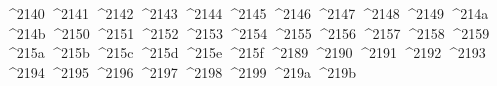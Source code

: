 {  ^^^^2140%
  ^^^^2141%
  ^^^^2142%
  ^^^^2143%
  ^^^^2144%
  ^^^^2145%
  ^^^^2146%
  ^^^^2147%
  ^^^^2148%
  ^^^^2149%
  ^^^^214a%
  ^^^^214b%
  ^^^^2150%
  ^^^^2151%
  ^^^^2152%
  ^^^^2153%
  ^^^^2154%
  ^^^^2155%
  ^^^^2156%
  ^^^^2157%
  ^^^^2158%
  ^^^^2159%
  ^^^^215a%
  ^^^^215b%
  ^^^^215c%
  ^^^^215d%
  ^^^^215e%
  ^^^^215f%
  ^^^^2189%
  ^^^^2190%
  ^^^^2191%
  ^^^^2192%
  ^^^^2193%
  ^^^^2194%
  ^^^^2195%
  ^^^^2196%
  ^^^^2197%
  ^^^^2198%
  ^^^^2199%
  ^^^^219a%
  ^^^^219b%
}
